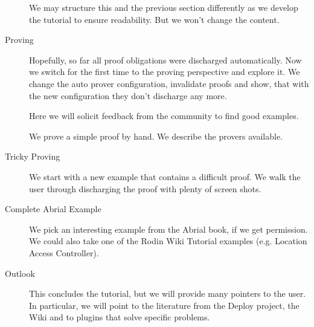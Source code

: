 \begin{description}
We may structure this and the previous section differently as we develop the tutorial to ensure readability.  But we won't change the content.

	\item[Proving] Hopefully, so far all proof obligations were discharged automatically.  Now we switch for the first time to the proving perspective and explore it.
      We change the auto prover configuration, invalidate proofs and show, that with the new configuration they don't discharge any more.

Here we will solicit feedback from the community to find good examples.


      We prove a simple proof by hand.  We describe the provers available.
	\item[Tricky Proving] We start with a new example that contains a difficult proof.  We walk the user through discharging the proof with plenty of screen shots.
	\item[Complete Abrial Example] We pick an interesting example from the Abrial book, if we get permission.  We could also take one of the Rodin Wiki Tutorial examples (e.g. Location Access Controller).
	\item[Outlook] This concludes the tutorial, but we will provide many pointers to the user.  In particular, we will point to the literature from the Deploy project, the Wiki and to plugins that solve specific problems.
\end{description}

